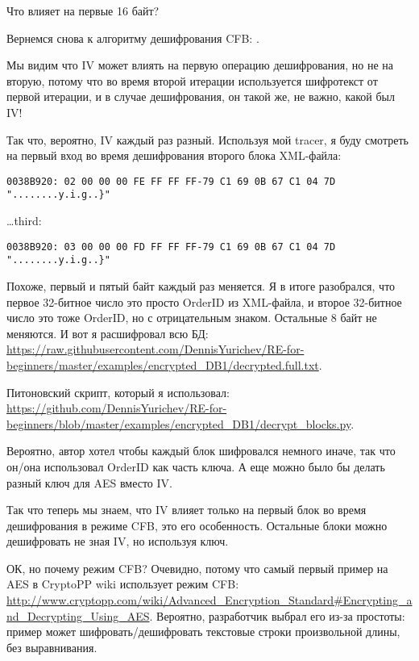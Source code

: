 Что влияет на первые 16 байт?

Вернемся снова к алгоритму дешифрования \ac{CFB}: .

Мы видим что \ac{IV} может влиять на первую операцию дешифрования, но не на вторую,
потому что во время второй итерации используется шифротекст от первой итерации, и в случае дешифрования,
он такой же, не важно, какой был \ac{IV}!

Так что, вероятно, \ac{IV} каждый раз разный.
Используя мой tracer, я буду смотреть на первый вход во время дешифрования второго блока \ac{XML}-файла:

\begin{lstlisting}
0038B920: 02 00 00 00 FE FF FF FF-79 C1 69 0B 67 C1 04 7D "........y.i.g..}"
\end{lstlisting}

\dots third:

\begin{lstlisting}
0038B920: 03 00 00 00 FD FF FF FF-79 C1 69 0B 67 C1 04 7D "........y.i.g..}"
\end{lstlisting}

Похоже, первый и пятый байт каждый раз меняется.
Я в итоге разобрался, что первое 32-битное число это просто OrderID из \ac{XML}-файла,
и второе 32-битное число это тоже OrderID, но с отрицательным знаком. Остальные 8 байт не меняются.
И вот я расшифровал всю БД:
\url{https://raw.githubusercontent.com/DennisYurichev/RE-for-beginners/master/examples/encrypted_DB1/decrypted.full.txt}.

Питоновский скрипт, который я использовал:
\url{https://github.com/DennisYurichev/RE-for-beginners/blob/master/examples/encrypted_DB1/decrypt_blocks.py}.

Вероятно, автор хотел чтобы каждый блок шифровался немного иначе, так что он/она использовал OrderID как часть ключа.
А еще можно было бы делать разный ключ для AES вместо \ac{IV}.

Так что теперь мы знаем, что \ac{IV} влияет только на первый блок во время дешифрования в режиме \ac{CFB},
это его особенность.
Остальные блоки можно дешифровать не зная \ac{IV}, но используя ключ.

ОК, но почему режим \ac{CFB}? Очевидно, потому что самый первый пример на AES в CryptoPP wiki
использует режим \ac{CFB}:
\url{http://www.cryptopp.com/wiki/Advanced_Encryption_Standard#Encrypting_and_Decrypting_Using_AES}.
Вероятно, разработчик выбрал его из-за простоты:
пример может шифровать/дешифровать текстовые строки произвольной длины, без выравнивания.

